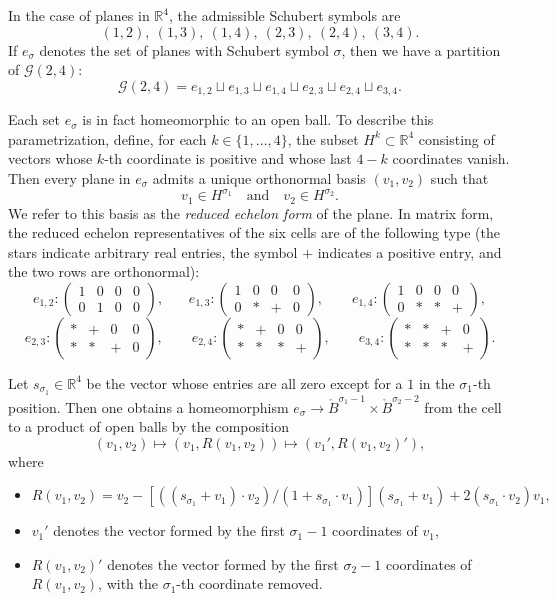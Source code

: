 \documentclass[a4paper,english,cleveref,autoref,thm-restate,nolineno]{socg-lipics-v2021}
\newcommand{\R}{\mathbb R}
\newcommand{\GG}{\mathcal G} %
\begin{document}
In the case of planes in $\R^4$, the admissible Schubert symbols are
\[
(1,2),\ (1,3),\ (1,4),\ (2,3),\ (2,4),\ (3,4).
\]
If $e_\sigma$ denotes the set of planes with Schubert symbol $\sigma$, then we have a partition of $\GG(2,4)$:
\[
\GG(2,4)
=
e_{1,2}\sqcup e_{1,3}\sqcup e_{1,4}\sqcup e_{2,3}\sqcup e_{2,4}\sqcup e_{3,4}.
\]

Each set $e_\sigma$ is in fact homeomorphic to an open ball.
To describe this parametrization, define, for each $k\in\{1,\dots,4\}$, the subset
$H^k\subset \R^4$ consisting of vectors whose $k$-th coordinate is positive and whose last $4-k$ coordinates vanish.
Then every plane in $e_\sigma$ admits a unique orthonormal basis $(v_1,v_2)$ such that
\[
v_1\in H^{\sigma_1}\quad \text{and}\quad v_2\in H^{\sigma_2}.
\]
We refer to this basis as the \emph{reduced echelon form} of the plane.
In matrix form, the reduced echelon representatives of the six cells are of the following type
(the stars indicate arbitrary real entries, the symbol $+$ indicates a positive entry, and the two rows are orthonormal):
\[
e_{1,2}:\begin{pmatrix}
	1&0&0&0\\
	0&1&0&0
\end{pmatrix},
~~~~~~~~
e_{1,3}:\begin{pmatrix}
	1&0&0&0\\
	0&*&+&0
\end{pmatrix},
\qquad
e_{1,4}:\begin{pmatrix}
	1&0&0&0\\
	0&*&*&+
\end{pmatrix},
\]
\[
e_{2,3}:\begin{pmatrix}
	*&+&0&0\\
	*&*&+&0
\end{pmatrix},
\qquad
e_{2,4}:\begin{pmatrix}
	*&+&0&0\\
	*&*&*&+
\end{pmatrix},
\qquad
e_{3,4}:\begin{pmatrix}
	*&*&+&0\\
	*&*&*&+
\end{pmatrix}.
\]

Let $s_{\sigma_1}\in \R^4$ be the vector whose entries are all zero except for a $1$ in the $\sigma_1$-th position.
Then one obtains a homeomorphism $e_\sigma \to \mathring{B}^{\sigma_1-1}\times \mathring{B}^{\sigma_2-2}$ from the cell to a product of open balls by the composition
\[
(v_1,v_2)\mapsto (v_1,R(v_1,v_2))
\mapsto (v_1',R(v_1,v_2)'),
\]
where
\begin{itemize}
	\item 
		$
		R(v_1,v_2)
		=
		v_2-[((s_{\sigma_1}+v_1)\cdot v_2)/(1+s_{\sigma_1}\cdot v_1)](s_{\sigma_1}+v_1)
		+2(s_{\sigma_1}\cdot v_2)v_1,
		$
	\item 
		$v_1'$ denotes the vector formed by the first $\sigma_1-1$ coordinates of $v_1$,
	\item 
		$R(v_1,v_2)'$ denotes the vector formed by the first $\sigma_2-1$ coordinates of $R(v_1,v_2)$, with the $\sigma_1$-th coordinate removed.
\end{itemize}
\end{document}
